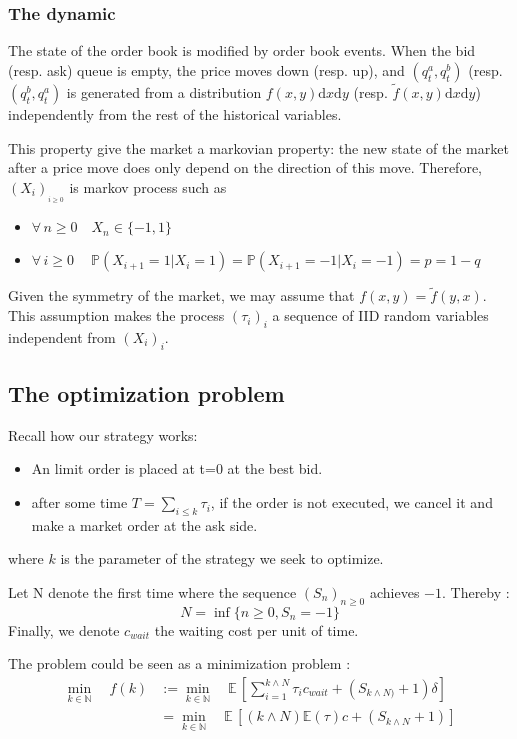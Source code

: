 \documentclass{article}
\newcommand{\Min}[2]{ {#1} \wedge {#2} }
\begin{document}
\subsubsection{The dynamic}


The state  of the order book is modified by order book events. When the bid (resp. ask) queue is empty, the price moves down (resp. up), and $(q_t^a, q_t^b)$ (resp.$ (q_t^b, q_t^a)$ is generated from a distribution $f(x, y) \mathrm{d}x \mathrm{d}y $ (resp. $\tilde f(x, y) \mathrm{d}x \mathrm{d}y $) independently from the rest of the historical variables.


This property give the market a markovian property: the new state of the market after a price move does only depend on the direction of this move.
Therefore,  $(X_i)_{_{i \geq 0}}$ is markov process such as 

\begin{itemize}
\item $\forall \, n\geq0 \quad X_{n} \in \{-1,1\} $ 
\item $\forall \, i\geq0 \quad\ \mathbb{P}( X_{i+1}=1 | X_i=1 ) = \mathbb{P}( X_{i+1}=-1 | X_i=-1 ) = p = 1-q$
\end{itemize}

Given the symmetry of the market, we may assume that $f(x, y) = \tilde f(y, x)$. This assumption makes the process $(\tau_i)_i$ a sequence of IID random variables independent from $(X_i)_i$.

\subsection{The optimization problem}
Recall how our strategy works:
\begin{itemize}
	\item An limit order is placed at t=0 at the best bid.
	\item after some time $T = \sum_{i \leq k} \tau_i$, if the order is not executed, we cancel it and make a market order at the ask side.
\end{itemize}
where $k$ is the parameter of the strategy we seek to optimize. 

Let N denote the first time where the sequence $(S_{n})_{n\geq0}$  achieves $-1$. Thereby :
$$ N= \inf \{ n\geq0 , S_{n}=-1   \} $$
Finally, we denote $c_{wait}$ the waiting cost per unit of time.

The problem could be seen as a minimization problem  :
\begin{align*}
 \min\limits_{k \in \mathbb{N}} \quad f(k) &:= \min\limits_{k \in \mathbb{N}} \quad \mathbb{E}\,\left[ \sum_{i=1}^{\Min k N}\tau_i c_{wait} + (S_{\Min k N)}+1)\delta\right] \\
&= \min\limits_{k \in \mathbb{N}} \quad \mathbb{E}\,\left[ ({\Min k N})  \mathbb{E}(\tau) c + (S_{\Min k N}+1) \right]
\end{align*}
\end{document}

